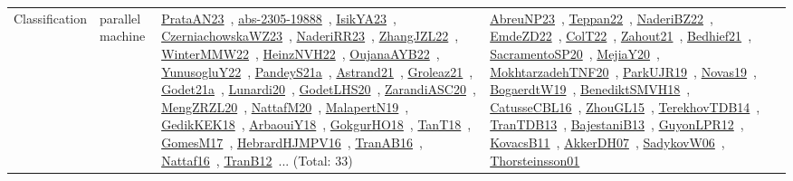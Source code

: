 {\begin{longtable}{lp{3cm}>{\raggedright\arraybackslash}p{6cm}>{\raggedright\arraybackslash}p{6cm}>{\raggedright\arraybackslash}p{8cm}}
Classification & parallel machine & \href{works/PrataAN23.pdf}{PrataAN23}~\cite{PrataAN23}, \href{works/abs-2305-19888.pdf}{abs-2305-19888}~\cite{abs-2305-19888}, \href{works/IsikYA23.pdf}{IsikYA23}~\cite{IsikYA23}, \href{works/CzerniachowskaWZ23.pdf}{CzerniachowskaWZ23}~\cite{CzerniachowskaWZ23}, \href{works/NaderiRR23.pdf}{NaderiRR23}~\cite{NaderiRR23}, \href{works/ZhangJZL22.pdf}{ZhangJZL22}~\cite{ZhangJZL22}, \href{works/WinterMMW22.pdf}{WinterMMW22}~\cite{WinterMMW22}, \href{works/HeinzNVH22.pdf}{HeinzNVH22}~\cite{HeinzNVH22}, \href{works/OujanaAYB22.pdf}{OujanaAYB22}~\cite{OujanaAYB22}, \href{works/YunusogluY22.pdf}{YunusogluY22}~\cite{YunusogluY22}, \href{works/PandeyS21a.pdf}{PandeyS21a}~\cite{PandeyS21a}, \href{works/Astrand21.pdf}{Astrand21}~\cite{Astrand21}, \href{works/Groleaz21.pdf}{Groleaz21}~\cite{Groleaz21}, \href{works/Godet21a.pdf}{Godet21a}~\cite{Godet21a}, \href{works/Lunardi20.pdf}{Lunardi20}~\cite{Lunardi20}, \href{works/GodetLHS20.pdf}{GodetLHS20}~\cite{GodetLHS20}, \href{works/ZarandiASC20.pdf}{ZarandiASC20}~\cite{ZarandiASC20}, \href{works/MengZRZL20.pdf}{MengZRZL20}~\cite{MengZRZL20}, \href{works/NattafM20.pdf}{NattafM20}~\cite{NattafM20}, \href{works/MalapertN19.pdf}{MalapertN19}~\cite{MalapertN19}, \href{works/GedikKEK18.pdf}{GedikKEK18}~\cite{GedikKEK18}, \href{works/ArbaouiY18.pdf}{ArbaouiY18}~\cite{ArbaouiY18}, \href{works/GokgurHO18.pdf}{GokgurHO18}~\cite{GokgurHO18}, \href{works/TanT18.pdf}{TanT18}~\cite{TanT18}, \href{works/GomesM17.pdf}{GomesM17}~\cite{GomesM17}, \href{works/HebrardHJMPV16.pdf}{HebrardHJMPV16}~\cite{HebrardHJMPV16}, \href{works/TranAB16.pdf}{TranAB16}~\cite{TranAB16}, \href{works/Nattaf16.pdf}{Nattaf16}~\cite{Nattaf16}, \href{works/TranB12.pdf}{TranB12}~\cite{TranB12}... (Total: 33) & \href{works/AbreuNP23.pdf}{AbreuNP23}~\cite{AbreuNP23}, \href{works/Teppan22.pdf}{Teppan22}~\cite{Teppan22}, \href{works/NaderiBZ22.pdf}{NaderiBZ22}~\cite{NaderiBZ22}, \href{works/EmdeZD22.pdf}{EmdeZD22}~\cite{EmdeZD22}, \href{works/ColT22.pdf}{ColT22}~\cite{ColT22}, \href{works/Zahout21.pdf}{Zahout21}~\cite{Zahout21}, \href{works/Bedhief21.pdf}{Bedhief21}~\cite{Bedhief21}, \href{works/SacramentoSP20.pdf}{SacramentoSP20}~\cite{SacramentoSP20}, \href{works/MejiaY20.pdf}{MejiaY20}~\cite{MejiaY20}, \href{works/MokhtarzadehTNF20.pdf}{MokhtarzadehTNF20}~\cite{MokhtarzadehTNF20}, \href{works/ParkUJR19.pdf}{ParkUJR19}~\cite{ParkUJR19}, \href{works/Novas19.pdf}{Novas19}~\cite{Novas19}, \href{works/BogaerdtW19.pdf}{BogaerdtW19}~\cite{BogaerdtW19}, \href{works/BenediktSMVH18.pdf}{BenediktSMVH18}~\cite{BenediktSMVH18}, \href{works/CatusseCBL16.pdf}{CatusseCBL16}~\cite{CatusseCBL16}, \href{works/ZhouGL15.pdf}{ZhouGL15}~\cite{ZhouGL15}, \href{works/TerekhovTDB14.pdf}{TerekhovTDB14}~\cite{TerekhovTDB14}, \href{works/TranTDB13.pdf}{TranTDB13}~\cite{TranTDB13}, \href{works/BajestaniB13.pdf}{BajestaniB13}~\cite{BajestaniB13}, \href{works/GuyonLPR12.pdf}{GuyonLPR12}~\cite{GuyonLPR12}, \href{works/KovacsB11.pdf}{KovacsB11}~\cite{KovacsB11}, \href{works/AkkerDH07.pdf}{AkkerDH07}~\cite{AkkerDH07}, \href{works/SadykovW06.pdf}{SadykovW06}~\cite{SadykovW06}, \href{works/Thorsteinsson01.pdf}{Thorsteinsson01}~\cite{Thorsteinsson01} & 
\end{longtable}}
